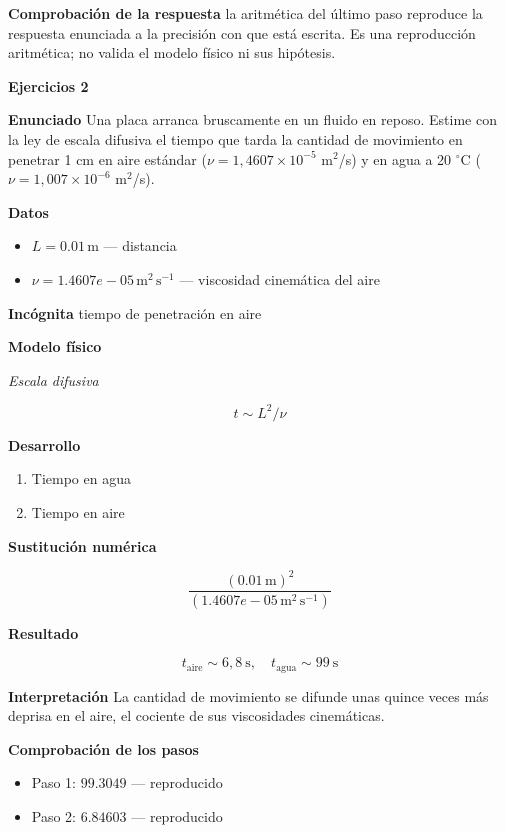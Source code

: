 \documentclass[10pt,openany]{book}
\begin{document}
\noindent\textbf{Comprobación de la respuesta} la aritmética del último paso reproduce la respuesta enunciada a la precisión con que está escrita. Es una reproducción aritmética; no valida el modelo físico ni sus hipótesis.

\noindent\textbf{Ejercicios 2}

\noindent\textbf{Enunciado}
Una placa arranca bruscamente en un fluido en reposo. Estime con la ley de escala difusiva el tiempo que tarda la cantidad de movimiento en penetrar 1 cm en aire estándar (\(\nu = 1{,}4607\times 10^{-5}\) m\(^2\)/s) y en agua a 20 \(^\circ\)C (\(\nu = 1{,}007\times 10^{-6}\) m\(^2\)/s).

\noindent\textbf{Datos}
\begin{itemize}
\item $L = 0.01\,\mathrm{m}$ — distancia
\item $\nu = 1.4607e-05\,\mathrm{m}^{2}\,\mathrm{s}^{-1}$ — viscosidad cinemática del aire
\end{itemize}

\noindent\textbf{Incógnita}
tiempo de penetración en aire

\noindent\textbf{Modelo físico}

\noindent\textit{Escala difusiva}

\[
t \sim L^{2}/\nu
\]

\noindent\textbf{Desarrollo}
\begin{enumerate}
\item
Tiempo en agua
\item
Tiempo en aire
\end{enumerate}

\noindent\textbf{Sustitución numérica}

\[
\frac{\left(0.01\,\mathrm{m}\right)^{2}}{\left(1.4607e-05\,\mathrm{m}^{2}\,\mathrm{s}^{-1}\right)}
\]

\noindent\textbf{Resultado}

\[
t_{\mathrm{aire}} \sim 6{,}8\ \mathrm{s},\quad t_{\mathrm{agua}} \sim 99\ \mathrm{s}
\]

\noindent\textbf{Interpretación}
La cantidad de movimiento se difunde unas quince veces más deprisa en el aire, el cociente de sus viscosidades cinemáticas.

\noindent\textbf{Comprobación de los pasos}
\begin{itemize}
\item Paso 1: $99.3049$ — reproducido
\item Paso 2: $6.84603$ — reproducido
\end{itemize}
\end{document}
